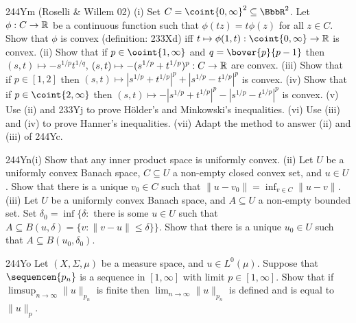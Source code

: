 {\spheader 244Ym ({\smc Roselli \& Willem 02})
(i) Set $C=\coint{0,\infty}^2\subseteq\BbbR^2$.   Let
$\phi:C\to\Bbb R$ be a continuous function
such that $\phi(tz)=t\phi(z)$ for all $z\in C$.
Show that $\phi$ is convex (definition:  233Xd) iff
$t\mapsto\phi(1,t):\coint{0,\infty}\to\Bbb R$ is convex.
(ii) Show that if $p\in\ooint{1,\infty}$ and $q=\bover{p}{p-1}$ then
$(s,t)\mapsto -s^{1/p}t^{1/q}$,
$(s,t)\mapsto -(s^{1/p}+t^{1/p})^p:C\to\Bbb R$ are convex.
(iii) Show that if $p\in[1,2]$ then
$(s,t)\mapsto|s^{1/p}+t^{1/p}|^p+|s^{1/p}-t^{1/p}|^p$ is convex.
(iv) Show that if $p\in\coint{2,\infty}$ then
$(s,t)\mapsto -|s^{1/p}+t^{1/p}|^p-|s^{1/p}-t^{1/p}|^p$ is convex.
(v) Use (ii) and 233Yj to prove H\"older's and Minkowski's inequalities.
(vi) Use (iii) and (iv) to prove Hanner's inequalities.
(vii) Adapt the method to answer (ii) and (iii) of 244Yc.

\spheader 244Yn(i) Show that any inner product space is
uniformly convex.
(ii) Let $U$ be a uniformly convex Banach space, $C\subseteq U$ a non-empty
closed convex set, and $u\in U$.   Show that there is a unique $v_0\in C$
such that $\|u-v_0\|=\inf_{v\in C}\|u-v\|$.
(iii) Let $U$ be a uniformly convex Banach space, and $A\subseteq U$ a
non-empty bounded set.   Set $\delta_0=\inf\{\delta:$ there is some
$u\in U$ such that $A\subseteq B(u,\delta)=\{v:\|v-u\|\le\delta\}\}$.
Show that there is a
unique $u_0\in U$ such that $A\subseteq B(u_0,\delta_0)$.

\spheader 244Yo Let $(X,\Sigma,\mu)$ be a measure space, and
$u\in L^0(\mu)$.   Suppose that $\sequencen{p_n}$ is a sequence in
$[1,\infty]$ with limit $p\in[1,\infty]$.   Show that if
$\limsup_{n\to\infty}\|u\|_{p_n}$ is finite then
$\lim_{n\to\infty}\|u\|_{p_n}$ is defined and is equal to $\|u\|_p$.
}%

